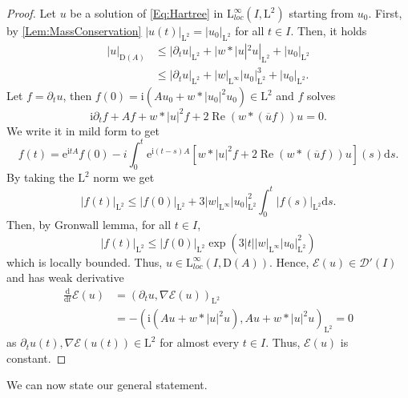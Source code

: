 \documentclass{article}
\def\L{\mathrm L}
\def\Q{\mathrm Q}
\def \p {\partial}
\DeclareMathOperator{\re}{Re}
\def\d{\mathrm{d}}
\newtheorem{cor}[theo]{Corollary}
\theoremstyle{definition}
\numberwithin{equation}{section}
\newcommand{\e}{\mathrm{e}} %
\newcommand{\complexI}{\mathrm{i}} %
\begin{document}
\begin{proof}

    Let $u$ be a solution of \cref{Eq:Hartree} in $\L^\infty_{loc}(I,\L^2)$ starting from $u_0$. First, by \cref{Lem:MassConservation} $|u(t)|_{\L^2}=|u_0|_{\L^2}$ for all $t\in I$. Then, it holds
    \begin{align*}
        |u|_{\mathrm{D}(A)}&\leqslant|\p_tu|_{\L^2}+|w*|u|^2u|_{\L^2}+|u_0|_{\L^2}\\
        &\leqslant|\p_tu|_{\L^2} + |w|_{\L^\infty}|u_0|_{\L^2}^3+|u_0|_{\L^2}.
    \end{align*}
    Let $f=\p_tu$, then $f(0)=\complexI\left(Au_0+w*|u_0|^2u_0\right)\in\L^2$ and $f$ solves
    $$\complexI\p_tf+Af+w*|u|^2f+2\re(w*(\overline{u}f))u=0.$$
    We write it in mild form to get
    $$f(t)=\e^{\complexI t A}f(0)-i\int_0^t\e^{\complexI (t-s) A}\left[w*|u|^2f+2\re(w*(\overline{u}f))u\right](s)\d s.$$
    By taking the $\L^2$ norm we get
    $$|f(t)|_{\L^2}\leqslant |f(0)|_{\L^2}+3|w|_{\L^\infty}|u_0|_{\L^2}^2\int_0^t|f(s)|_{\L^2}\d s.$$
    Then, by Gronwall lemma, for all $t\in I$,
    $$|f(t)|_{\L^2}\leqslant |f(0)|_{\L^2}\exp\left(3|t||w|_{\L^\infty}|u_0|_{\L^2}^2\right)$$
    which is locally bounded. Thus, $u\in\L^{\infty}_{loc}(I,\mathrm{D}(A))$. Hence, $\mathcal{E}(u)\in\mathcal{D}'(I)$ and has weak derivative
    \begin{align*}
        \frac{\d}{\d t}\mathcal{E}(u) &=\left(\p_t u,\nabla\mathcal{E}(u)\right)_{\L^2}\\
        &= - \left(\complexI(Au+w*|u|^2u),Au+w*|u|^2u\right)_{\L^2} = 0
    \end{align*}
    as $\p_t u(t),\nabla\mathcal{E}(u(t))\in\L^2$ for almost every $t\in I$. Thus, $\mathcal{E}(u)$ is constant.

\end{proof}

We can now state our general statement.

\end{document}

